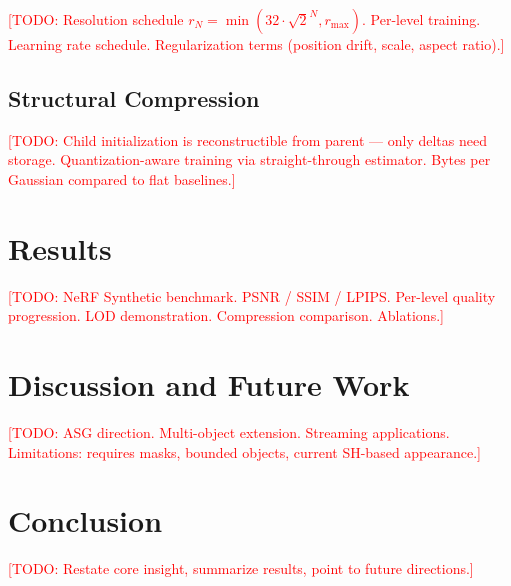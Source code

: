 \documentclass[acmtog]{acmart}
\newcommand{\todo}[1]{\textcolor{red}{[TODO: #1]}}
\begin{document}
\todo{Resolution schedule $r_N = \min(32 \cdot \sqrt{2}^N, r_{\max})$. Per-level training. Learning rate schedule. Regularization terms (position drift, scale, aspect ratio).}

\subsection{Structural Compression}

\todo{Child initialization is reconstructible from parent --- only deltas need storage. Quantization-aware training via straight-through estimator. Bytes per Gaussian compared to flat baselines.}

\section{Results}

\todo{NeRF Synthetic benchmark. PSNR / SSIM / LPIPS. Per-level quality progression. LOD demonstration. Compression comparison. Ablations.}

\section{Discussion and Future Work}

\todo{ASG direction. Multi-object extension. Streaming applications. Limitations: requires masks, bounded objects, current SH-based appearance.}

\section{Conclusion}

\todo{Restate core insight, summarize results, point to future directions.}



\end{document}
